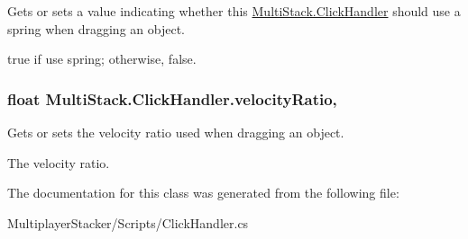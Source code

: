 Gets or sets a value indicating whether this \hyperlink{class_multi_stack_1_1_click_handler}{Multi\+Stack.\+Click\+Handler} should use a spring when dragging an object. 

{\ttfamily true} if use spring; otherwise, {\ttfamily false}.\hypertarget{class_multi_stack_1_1_click_handler_a190adce119045b21706fefa1e0ad2b7b}{}
\subsubsection[{velocity\+Ratio}]{\setlength{\rightskip}{0pt plus 5cm}float Multi\+Stack.\+Click\+Handler.\+velocity\+Ratio\hspace{0.3cm}{\ttfamily [get]}, {\ttfamily [set]}}\label{class_multi_stack_1_1_click_handler_a190adce119045b21706fefa1e0ad2b7b}


Gets or sets the velocity ratio used when dragging an object. 

The velocity ratio.

The documentation for this class was generated from the following file\+:\begin{DoxyCompactItemize}
\item 
Multiplayer\+Stacker/\+Scripts/Click\+Handler.\+cs\end{DoxyCompactItemize}
